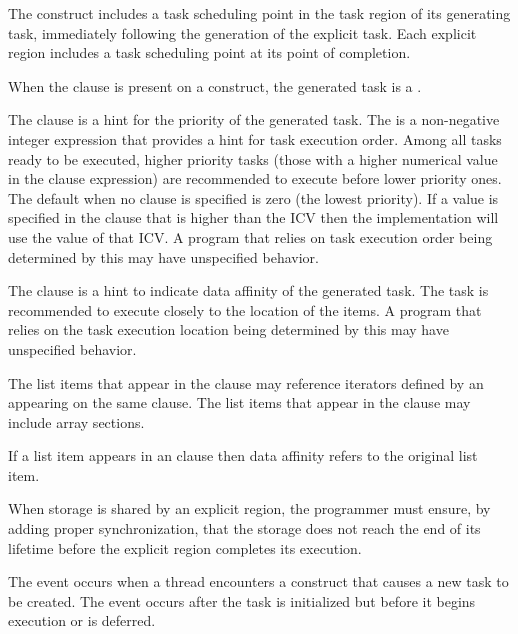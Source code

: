 The  construct includes a task scheduling point in the task region of its generating
task, immediately following the generation of the explicit task. Each explicit 
region includes a task scheduling point at its point of completion.

When the  clause is present on a  construct, the generated task is a .

The  clause is a hint for the priority of the generated task. The  is a
non-negative integer expression that provides a hint for task execution order. Among all
tasks ready to be executed, higher priority tasks (those with a higher numerical value in the
 clause expression) are recommended to execute before lower priority ones. The default
 when no  clause is specified is zero (the lowest priority). If a value is
specified in the  clause that is higher than the  ICV then the
implementation will use the value of that ICV. A program that relies on task execution order
being determined by this  may have unspecified behavior.

The  clause is a hint to indicate data affinity of the generated
task. The task is recommended to execute closely to the location of the  items. 
A program that relies on the task execution location
being determined by this  may have unspecified behavior.

The list items that appear in the  clause may reference iterators
defined by an  appearing on the same clause.
The list items that appear in the  clause may include array sections.

If a list item appears in an  clause then data affinity refers to the original list item.

\begin{note}
When storage is shared by an explicit  region, the
programmer must ensure, by adding proper synchronization, that the storage does not
reach the end of its lifetime before the explicit  region completes its execution.
\end{note}

\events

The  event occurs when a thread encounters a construct
that causes a new task to be created.
The event occurs after the task is initialized but before
it begins execution or is deferred.

